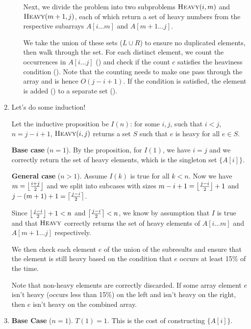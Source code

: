 \documentclass[12pt,a4paper]{article}
\begin{document}
\begin{enumerate}[label=(\alph*)]
\begin{enumerate}[label=(\roman*)]
			Next, we divide the problem into two subproblems $\textproc{Heavy}(i, m)$ and $\textproc{Heavy}(m+1, j)$, each of which return a set of heavy numbers from the respective subarrays $A[i \dots m]$ and $A[m+1 \dots j]$.

			We take the union of these sets ($L \cup R$) to ensure no duplicated elements, then walk through the set. For each distinct element, we count the occurrences in $A[i \dots j]$ () and check if the count $c$ satisfies the heaviness condition (). Note that the counting needs to make one pass through the array and is hence $O(j - i + 1)$. If the condition is satisfied, the element is added () to a separate set ().
		\end{enumerate}
		
		\item
		Let's do some induction!

		Let the inductive proposition be $I(n)$: for some $i,j$, such that $i < j$, $n = j - i + 1$, $\textproc{Heavy}(i, j)$ returns a set $S$ such that $e$ is heavy for all $e \in S$.

		\textbf{Base case} ($n = 1$). By the proposition, for $I(1)$, we have $i = j$ and we correctly return the set of heavy elements, which is the singleton set $\{A[i]\}$.

		\textbf{General case} ($n > 1$). Assume $I(k)$ is true for all $k < n$. Now we have $m = \floor*{\frac{i + j}{2}}$ and we split into subcases with sizes $m - i + 1 = \floor*{\frac{j - i}{2}} + 1$ and $j - (m + 1) + 1 = \ceil*{\frac{j - i}{2}}$.
		
		Since $\floor*{\frac{j - i}{2}} + 1 < n$ and $\ceil*{\frac{j - i}{2}} < n$, we know by assumption that $I$ is true and that $\textproc{Heavy}$ correctly returns the set of heavy elements of $A[i\dots m]$ and $A[m+1 \dots j]$ respectively.

		We then check each element $e$ of the union of the subresults and ensure that the element is still heavy based on the condition that $e$ occurs at least 15\% of the time.

		Note that non-heavy elements are correctly discarded. If some array element $e$ isn't heavy (occurs less than 15\%) on the left and isn't heavy on the right, then $e$ isn't heavy on the combined array.

		\item
		\textbf{Base Case} ($n = 1$). $T(1) = 1$. This is the cost of constructing $\{A[i]\}$.


\end{enumerate}
\end{document}
